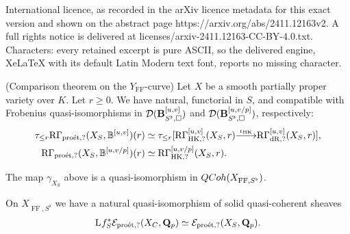 \documentclass[10pt,a4paper]{amsart}
\def\B{{\bf B}}
\def\Q{{\bf Q}} \def\Z{{\bf Z}}
\def\R{{\mathrm R}}
\def\lomapr#1{\smash{\mathop{\relbar\joinrel\longrightarrow}\limits^{#1}}}
\newcommand{\FF}{\operatorname{FF} }
\newcommand{\LL}{\operatorname{L} }
\newcommand{\dr}{\operatorname{dR} }
\newcommand{\hk}{\operatorname{HK} }
\newcommand{\proeet}{\operatorname{pro\acute{e}t} }
\newcommand{\sd}{{\mathcal{D}}}
\newcommand{\se}{{\mathcal{E}}}
\begin{document}
International licence, as recorded in the arXiv licence metadata for this exact version and shown on the abstract page https://arxiv.org/abs/2411.12163v2. A full rights notice is delivered at licenses/arxiv-2411.12163-CC-BY-4.0.txt. Characters: every retained excerpt is pure ASCII, so the delivered engine, XeLaTeX with its default Latin Modern text font, reports no missing character.
\begin{theorem}{\rm (Comparison theorem on the $Y_{\FF}$-curve)} \label{hot1} 
Let $X$ be a smooth partially proper variety over $K$.  Let $r\geq 0$. We have  natural, functorial in $S$, and compatible with Frobenius  quasi-isomorphisms in $\sd(\B^{[u,v]}_{S^{\flat},\Box})$ 
and $\sd(\B^{[u,v/p]}_{S^{\flat},\Box})$, respectively:
\begin{align}\label{kin1}
\tau_{\leq r}\R\Gamma_{\proeet,?}(X_S,{\mathbb B}^{[u,v]})(r) & \simeq \tau_{\leq r}[\R\Gamma^{{[u,v]}}_{\hk,?}(X_S,r)\lomapr{\iota_{\hk}} \R\Gamma_{\dr,?}^{{[u,v]}}(X_S,r)],\\
\R\Gamma_{\proeet,?}(X_S,{\mathbb B}^{[u,v/p]})(r) & \simeq \R\Gamma^{{[u,v/p]}}_{\hk,?}(X_S,r).\notag
\end{align}
\end{theorem}

 \begin{lemma}\label{kolobrzeg4a}
The map $ \gamma_{X_S}$ above is a quasi-isomorphism in ${\rm QCoh}(X_{\FF,S^{\flat}})$. 
\end{lemma}

\begin{lemma}\label{dziecko1} 
On $X_{\FF,S^{\flat}}$ we have a natural quasi-isomorphism of solid quasi-coherent sheaves
\begin{align*}
\LL\hskip-.4mm f^*_S\se_{\proeet,?}(X_C,\Q_p) \simeq \se_{\proeet,?}(X_S,\Q_p).
\end{align*}
\end{lemma}
\end{document}
